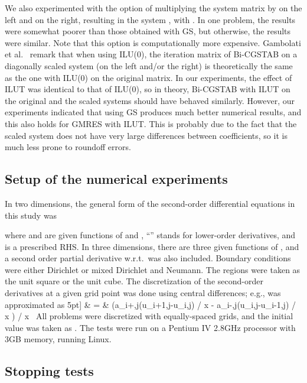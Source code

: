 \documentclass[12pt,a4paper]{article}
\newcounter{i}
\def\half{\scriptstyle \frac{1}{2}}
\begin{document}
We also experimented with the option of multiplying the system 
matrix  by  on the left and on the right, resulting 
in the system , with 
.  In one problem, the results were somewhat
poorer than those obtained with GS, but otherwise, the results
were similar.  Note that this option is computationally more
expensive.
Gambolati et al.\ \cite{Gambolati03} remark that when using ILU(0),
the iteration matrix of Bi-CGSTAB on a diagonally scaled system
(on the left and/or the right) is theoretically the same as the
one with ILU(0) on the original matrix.  In our experiments, the
effect of ILUT was identical to that of ILU(0), so in theory, 
Bi-CGSTAB with ILUT on the original and the scaled systems should 
have behaved similarly.  However, our experiments indicated that 
using GS produces much better numerical results, and this also 
holds for GMRES with ILUT.  This is probably due to the fact that 
the scaled system does not have very large differences between 
coefficients, so it is much less prone to roundoff errors.




\subsection{Setup of the numerical experiments}
\label{setup}

In two dimensions, the general form of the second-order differential 
equations in this study was

where  and  are given functions of  and , ``'' 
stands for lower-order derivatives, and  is a prescribed RHS.  
In three dimensions, there are three given functions  of 
, and a second order partial derivative w.r.t.\  was 
also included.  Boundary conditions were either Dirichlet or mixed 
Dirichlet and Neumann.  The regions were taken as the unit square 
or the unit cube.  The discretization of the second-order 
derivatives at a given grid point  was done using central 
differences; e.g., 
 was approximated as
5pt]
& = & \left(a_{i+\half,j}(u_{i+1,j}-u_{i,j}) / \Delta x -
            a_{i-\half,j}(u_{i,j}-u_{i-1,j}) / \Delta x \right) / \Delta x \
All problems were discretized with equally-spaced grids, and the initial
value was taken as .
The tests were run on a Pentium IV 2.8GHz processor with 3GB memory,
running Linux. 



\subsection{Stopping tests}
\end{document}
